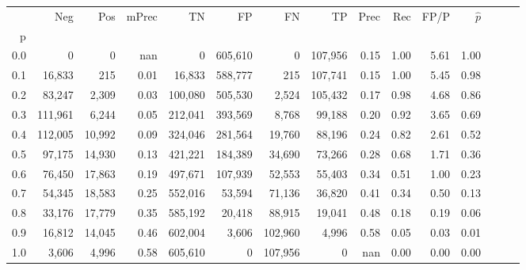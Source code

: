 \begin{tabular}{rrrrrrrrrrrrrrr}
\toprule
{} &      Neg &     Pos & mPrec &       TN &       FP &       FN &       TP &  Prec &   Rec &  FP/P & $\hat{p}$ \\
p   &          &         &       &          &          &          &          &       &       &       &           \\
\midrule
0.0 &        0 &       0 &   nan &        0 &  605,610 &        0 &  107,956 &  0.15 &  1.00 &  5.61 &      1.00 \\
0.1 &   16,833 &     215 &  0.01 &   16,833 &  588,777 &      215 &  107,741 &  0.15 &  1.00 &  5.45 &      0.98 \\
0.2 &   83,247 &   2,309 &  0.03 &  100,080 &  505,530 &    2,524 &  105,432 &  0.17 &  0.98 &  4.68 &      0.86 \\
0.3 &  111,961 &   6,244 &  0.05 &  212,041 &  393,569 &    8,768 &   99,188 &  0.20 &  0.92 &  3.65 &      0.69 \\
0.4 &  112,005 &  10,992 &  0.09 &  324,046 &  281,564 &   19,760 &   88,196 &  0.24 &  0.82 &  2.61 &      0.52 \\
0.5 &   97,175 &  14,930 &  0.13 &  421,221 &  184,389 &   34,690 &   73,266 &  0.28 &  0.68 &  1.71 &      0.36 \\
0.6 &   76,450 &  17,863 &  0.19 &  497,671 &  107,939 &   52,553 &   55,403 &  0.34 &  0.51 &  1.00 &      0.23 \\
0.7 &   54,345 &  18,583 &  0.25 &  552,016 &   53,594 &   71,136 &   36,820 &  0.41 &  0.34 &  0.50 &      0.13 \\
0.8 &   33,176 &  17,779 &  0.35 &  585,192 &   20,418 &   88,915 &   19,041 &  0.48 &  0.18 &  0.19 &      0.06 \\
0.9 &   16,812 &  14,045 &  0.46 &  602,004 &    3,606 &  102,960 &    4,996 &  0.58 &  0.05 &  0.03 &      0.01 \\
1.0 &    3,606 &   4,996 &  0.58 &  605,610 &        0 &  107,956 &        0 &   nan &  0.00 &  0.00 &      0.00 \\
\bottomrule
\end{tabular}
